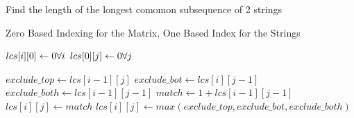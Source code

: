\documentclass[12pt]{article}
\begin{document}
\begin{algorithm}

  \caption{Find the length of the longest comomon subsequence of 2 strings}
  \begin{algorithmic}[1]
    \Ensure Zero Based Indexing for the Matrix, One Based Index for the Strings
    \Statex
        
        \State $lcs[i][0] \gets 0 \hfill \forall i$ 
        \State $lcs[0][j] \gets 0 \hfill \forall j$ 

                \State $exclude\_top \gets lcs[i-1][j]$
                \State $exclude\_bot \gets lcs[i][j-1]$
                \State $exclude\_both \gets lcs[i-1][j-1]$
                \State $match \gets 1 + lcs[i-1][j-1] $
                    \State $lcs[i][j] \gets match$
                \Else 
                    \State $lcs[i][j] \gets max(exclude\_top, exclude\_bot, exclude\_both) $
                \EndIf
            \EndFor
        \EndFor
        
        \State {}
    \EndFunction
  \end{algorithmic}
  
\end{algorithm}
\end{document}
